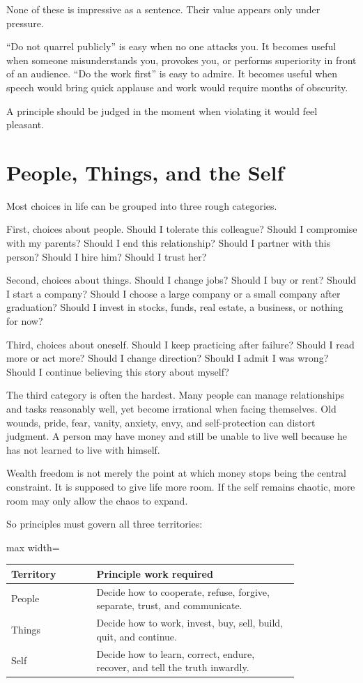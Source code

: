 None of these is impressive as a sentence. Their value appears only under pressure.

``Do not quarrel publicly'' is easy when no one attacks you. It becomes useful when someone misunderstands you, provokes you, or performs superiority in front of an audience. ``Do the work first'' is easy to admire. It becomes useful when speech would bring quick applause and work would require months of obscurity.

A principle should be judged in the moment when violating it would feel pleasant.

\section*{People, Things, and the Self}

Most choices in life can be grouped into three rough categories.

First, choices about people. Should I tolerate this colleague? Should I compromise with my parents? Should I end this relationship? Should I partner with this person? Should I hire him? Should I trust her?

Second, choices about things. Should I change jobs? Should I buy or rent? Should I start a company? Should I choose a large company or a small company after graduation? Should I invest in stocks, funds, real estate, a business, or nothing for now?

Third, choices about oneself. Should I keep practicing after failure? Should I read more or act more? Should I change direction? Should I admit I was wrong? Should I continue believing this story about myself?

The third category is often the hardest. Many people can manage relationships and tasks reasonably well, yet become irrational when facing themselves. Old wounds, pride, fear, vanity, anxiety, envy, and self-protection can distort judgment. A person may have money and still be unable to live well because he has not learned to live with himself.

Wealth freedom is not merely the point at which money stops being the central constraint. It is supposed to give life more room. If the self remains chaotic, more room may only allow the chaos to expand.

So principles must govern all three territories:

\begin{center}
\begin{adjustbox}{max width=\linewidth}
\begin{tabular}{p{0.24\linewidth}p{0.58\linewidth}}
\hline
Territory & Principle work required \\
\hline
People & Decide how to cooperate, refuse, forgive, separate, trust, and communicate. \\
Things & Decide how to work, invest, buy, sell, build, quit, and continue. \\
Self & Decide how to learn, correct, endure, recover, and tell the truth inwardly. \\
\hline
\end{tabular}
\end{adjustbox}
\end{center}


